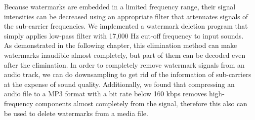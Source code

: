 Because watermarks are embedded in a limited frequency range, their signal intensities can be decreased using an appropriate filter that attenuates signals of the sub-carrier frequencies.
We implemented a watermark deletion program that simply applies low-pass filter with 17,000 Hz cut-off frequency to input sounds.
As demonstrated in the following chapter, this elimination method can make watermarks inaudible almost completely, but part of them can be decoded even after the elimination.
In order to completely remove watermark signals from an audio track, we can do downsampling to get rid of the information of sub-carriers at the expense of sound quality.
Additionally, we found that compressing an audio file to a MP3 format with a bit rate below 160 kbps removes high-frequency components almost completely from the signal, therefore this also can be used to delete watermarks from a media file.

